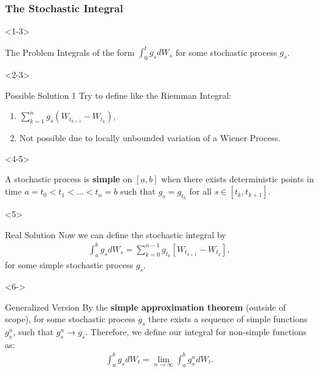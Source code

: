 \documentclass[10pt]{beamer}
\begin{document}
\begin{frame}[t]
  \frametitle{The Stochastic Integral}
  \begin{onlyenv}<1-3>
    \begin{block}{The Problem}
      Integrals of the form $\displaystyle\int_{0}^{t}g_s dW_s$ for some stochastic process $g_s$.
    \end{block}
  \end{onlyenv}
  \begin{onlyenv}<2-3>
    \begin{block}{Possible Solution 1}
      Try to define like the Riemman Integral:
      \begin{enumerate}
        \item<2-> $\displaystyle\sum_{k = 1}^{n}g_s(W_{t_{k+1}} - W_{t_{k}})$,
        \item<3-> Not possible due to locally unbounded variation of a Wiener Process.
      \end{enumerate}
    \end{block}
  \end{onlyenv}
  \begin{onlyenv}<4-5>
    \begin{definition}
      A stochastic process is \textbf{simple} on $[a,b]$ when there exists deterministic points in time $a = t_0 < t_1 < \dots < t_n = b$ such that $g_s = g_{t_k}$ for all $s \in [t_k, t_{k+1}]$.
    \end{definition}
  \end{onlyenv}
  \begin{onlyenv}<5>
      \begin{block}{Real Solution}
        Now we can define the stochastic integral by
        \begin{align*}
          \displaystyle\int_{a}^{b}g_s dW_s = \displaystyle\sum_{k = 0}^{n - 1}g_{t_k}[W_{t_{k+1}} - W_{t_{k}}],
        \end{align*}
        for some simple stochastic process $g_s$.
      \end{block}
  \end{onlyenv}
  \begin{onlyenv}<6->
    \begin{block}{Generalized Version}
      By the \textbf{simple approximation theorem} (outside of scope), for some stochastic process $g_s$ there exists a sequence of simple functions $g_{s}^{n}$, such that $g_{s}^{n} \to g_{s}$. Therefore, we define our integral for non-simple functions as:
      \begin{align*}
        \displaystyle\int_{a}^{b}g_{s} dW_t = \lim\limits_{n \to \infty}\displaystyle\int_{a}^{b} g_{s}^{n}dW_t.
      \end{align*}
    \end{block}
  \end{onlyenv}
\end{frame}
\end{document}
